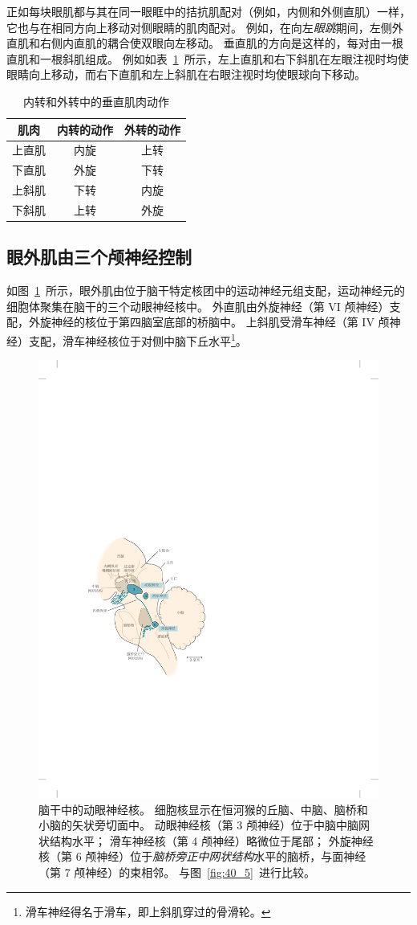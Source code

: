 正如每块眼肌都与其在同一眼眶中的拮抗肌配对（例如，内侧和外侧直肌）一样，它也与在相同方向上移动对侧眼睛的肌肉配对。
例如，在向左\textit{眼跳}期间，左侧外直肌和右侧内直肌的耦合使双眼向左移动。
垂直肌的方向是这样的，每对由一根直肌和一根斜肌组成。
例如如表~\ref{tab:35_1}~所示，左上直肌和右下斜肌在左眼注视时均使眼睛向上移动，而右下直肌和左上斜肌在右眼注视时均使眼球向下移动。


\begin{table}[htbp]
	\caption{内转和外转中的垂直肌肉动作\label{tab:35_1}}
	\centering
	\begin{tabular}{ccc}
		\toprule
		肌肉 & 内转的动作 
		& 外转的动作 \\
		\midrule
		上直肌 & 内旋  & 上转 \\
		下直肌      & 外旋 	& 下转 \\
		上斜肌      & 下转 	& 内旋 \\
		下斜肌      & 上转 	& 外旋 \\
		\bottomrule
	\end{tabular}
\end{table}



\subsection{眼外肌由三个颅神经控制}

如图~\ref{fig:35_3}~所示，眼外肌由位于脑干特定核团中的运动神经元组支配，运动神经元的细胞体聚集在脑干的三个动眼神经核中。
外直肌由外旋神经（第 VI 颅神经）支配，外旋神经的核位于第四脑室底部的桥脑中。
上斜肌受滑车神经（第 IV 颅神经）支配，滑车神经核位于对侧中脑下丘水平\footnote{滑车神经得名于滑车，即上斜肌穿过的骨滑轮。}。


\begin{figure}[htbp]
	\centering
	\includegraphics[width=0.62\linewidth]{chap35/fig_35_3}
	\caption{脑干中的动眼神经核。
		细胞核显示在恒河猴的丘脑、中脑、脑桥和小脑的矢状旁切面中。
		动眼神经核（第 3 颅神经）位于中脑中脑网状结构水平；
		滑车神经核（第 4 颅神经）略微位于尾部；
		外旋神经核（第 6 颅神经）位于\textit{脑桥旁正中网状结构}水平的脑桥，与面神经（第 7 颅神经）的束相邻\cite{henn1982primate}。 
		与图~\ref{fig:40_5}~进行比较。}
	\label{fig:35_3}
\end{figure}


